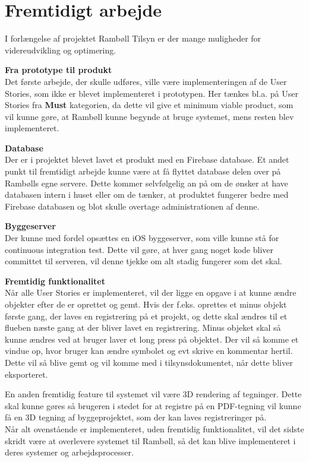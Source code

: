 \chapter{Fremtidigt arbejde}
I forlængelse af projektet Rambøll Tilsyn er der mange muligheder for videreudvikling og optimering.

\textbf{Fra prototype til produkt} \\
Det første arbejde, der skulle udføres, ville være implementeringen af de User Stories, som ikke er blevet implementeret i prototypen. Her tænkes bl.a. på User Stories fra \textbf{Must} kategorien, da dette vil give et minimum viable product, som vil kunne gøre, at Rambøll kunne begynde at bruge systemet, mens resten blev implementeret. 

\textbf{Database} \\
Der er i projektet blevet lavet et produkt med en Firebase database. Et andet punkt til fremtidigt arbejde kunne være at få flyttet database delen over på Rambølls egne servere. Dette kommer selvfølgelig an på om de ønsker at have databasen intern i huset eller om de tænker, at produktet fungerer bedre med Firebase databasen og blot skulle overtage administrationen af denne. 

\textbf{Byggeserver} \\
Der kunne med fordel opsættes en iOS byggeserver, som ville kunne stå for continuous integration\cite{CI} test. Dette vil gøre, at hver gang noget kode bliver committet til serveren, vil denne tjekke om alt stadig fungerer som det skal.

\textbf{Fremtidig funktionalitet} \\
Når alle User Stories er implementeret, vil der ligge en opgave i at kunne ændre objekter efter de er oprettet og gemt. Hvis der f.eks. oprettes et minus objekt første gang, der laves en registrering på et projekt, og dette skal ændres til et flueben næste gang at der bliver lavet en registrering. Minus objeket skal så kunne ændres ved at bruger laver et long press på objektet. Der vil så komme et vindue op, hvor bruger kan ændre symbolet og evt skrive en kommentar hertil. Dette vil så blive gemt og vil komme med i tilsynsdokumentet, når dette bliver eksporteret. 

En anden fremtidig feature til systemet vil være 3D rendering af tegninger. Dette skal kunne gøres så brugeren i stedet for at registre på en PDF-tegning vil kunne få en 3D tegning af byggeprojektet, som der kan laves registreringer på. \\

Når alt ovenstående er implementeret, uden fremtidig funktionalitet, vil det sidste skridt være at overlevere systemet til Rambøll, så det kan blive implementeret i deres systemer og arbejdsprocesser.